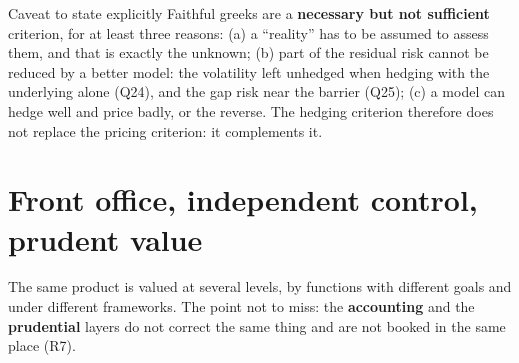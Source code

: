 \documentclass[11pt,a4paper]{article}
\begin{document}
\begin{navybox}{Caveat to state explicitly}
Faithful greeks are a \textbf{necessary but not sufficient} criterion, for at least three reasons: (a) a
``reality'' has to be assumed to assess them, and that is exactly the unknown; (b) part of the
residual risk cannot be reduced by a better model: the volatility left unhedged when hedging
with the underlying alone (Q24), and the gap risk near the barrier (Q25); (c) a model can hedge
well and price badly, or the reverse. The hedging criterion therefore does not replace the pricing
criterion: it complements it.
\end{navybox}

\section{Front office, independent control, prudent value}

The same product is valued at several levels, by functions with different goals and under different
frameworks. The point not to miss: the \textbf{accounting} and the \textbf{prudential} layers do not correct the
same thing and are not booked in the same place (R7).
\end{document}
